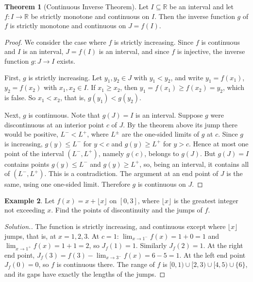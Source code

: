 \documentclass[11pt,a4paper]{article}
\numberwithin{equation}{section}
\theoremstyle{definition}
\newtheorem{thm}{Theorem}[subsection]
\newtheorem{exa}[thm]{Example}
\newenvironment{solution}
  {\renewcommand{\qedsymbol}{}\begin{proof}[\textit{Solution}.]}
  {\end{proof}}
\begin{document}
\begin{thm}[Continuous Inverse Theorem]
Let $I\subseteq \mathbb{R}$ be an interval and let $f: I\longrightarrow \mathbb{R}$ be strictly monotone and continuous on $I$. Then the inverse function $g$ of $f$ is strictly monotone and continuous on $J = f(I)$.
\end{thm}

\begin{proof}
We consider the case where $f$ is strictly increasing. Since $f$ is continuous and $I$ is an interval, $J = f(I)$ is an interval, and since $f$ is injective, the inverse function $g: J\longrightarrow I$ exists.

First, $g$ is strictly increasing. Let $y_1, y_2\in J$ with $y_1 < y_2$, and write $y_1 = f(x_1)$, $y_2 = f(x_2)$ with $x_1, x_2\in I$. If $x_1\geq x_2$, then $y_1 = f(x_1) \geq f(x_2) = y_2$, which is false. So $x_1 < x_2$, that is, $g(y_1) < g(y_2)$.

Next, $g$ is continuous. Note that $g(J) = I$ is an interval. Suppose $g$ were discontinuous at an interior point $c$ of $J$. By the theorem above its jump there would be positive, $L^- < L^+$, where $L^\pm$ are the one-sided limits of $g$ at $c$. Since $g$ is increasing, $g(y)\leq L^-$ for $y<c$ and $g(y)\geq L^+$ for $y>c$. Hence at most one point of the interval $(L^-, L^+)$, namely $g(c)$, belongs to $g(J)$. But $g(J) = I$ contains points $g(y)\leq L^-$ and $g(y)\geq L^+$, so, being an interval, it contains all of $(L^-, L^+)$. This is a contradiction. The argument at an end point of $J$ is the same, using one one-sided limit. Therefore $g$ is continuous on $J$.
\end{proof}

\begin{exa}
Let $f(x) = x + \lfloor x\rfloor$ on $[0,3]$, where $\lfloor x\rfloor$ is the greatest integer not exceeding $x$. Find the points of discontinuity and the jumps of $f$.
\end{exa}

\begin{solution}
The function is strictly increasing, and continuous except where $\lfloor x\rfloor$ jumps, that is, at $x = 1,2,3$. At $c = 1$: $\lim_{x\rightarrow1^-}f(x) = 1+0 = 1$ and $\lim_{x\rightarrow1^+}f(x) = 1+1 = 2$, so $J_f(1) = 1$. Similarly $J_f(2) = 1$. At the right end point, $J_f(3) = f(3) - \lim_{x\rightarrow3^-}f(x) = 6 - 5 = 1$. At the left end point $J_f(0) = 0$, so $f$ is continuous there. The range of $f$ is $[0,1)\cup[2,3)\cup[4,5)\cup\{6\}$, and its gaps have exactly the lengths of the jumps.
\end{solution}
\end{document}
